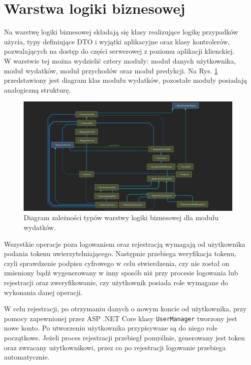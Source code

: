 \section{Warstwa logiki biznesowej}
Na warstwę logiki biznesowej składają się klasy realizujące logikę przypadków użycia, typy definiujące DTO i wyjątki aplikacyjne oraz klasy kontrolerów, pozwalających na dostęp do części serwerowej z poziomu aplikacji klienckiej.\\
W warstwie tej można wydzielić cztery moduły: moduł danych użytkownika, moduł wydatków, moduł przychodów oraz moduł predykcji. Na Rys. \ref{expensediagram} przedstawiony jest diagram klas modułu wydatków, pozostałe moduły posiadają analogiczną strukturę.
\begin{figure}[!ht]
	\begin{center}
		\includegraphics[width=6in]{img/diagram/expense_diagram.png}
		\caption{Diagram zależności typów warstwy logiki biznesowej dla modułu wydatków.}
		\label{expensediagram}
	\end{center}
\end{figure}

Wszystkie operacje poza logowaniem oraz rejestracją wymagają od użytkownika podania tokenu uwierzytelniającego. Następnie przebiega weryfikacja tokenu, czyli sprawdzenie podpisu cyfrowego w celu stwierdzenia, czy nie został on zmieniony bądź wygenerowany w inny sposób niż przy procesie logowania lub rejestracji oraz zweryfikowanie, czy użytkownik posiada role wymagane do wykonania danej operacji.

W celu rejestracji, po otrzymaniu danych o nowym koncie od użytkownika, przy pomocy zapewnionej przez ASP .NET Core klasy \lstinline|UserManager| tworzony jest nowe konto. Po utworzeniu użytkownika przypisywane są do niego role początkowe. Jeżeli proces rejestracji przebiegł pomyślnie, generowany jest token oraz zwracany użytkownikowi, przez co po rejestracji logowanie przebiega automatycznie.

